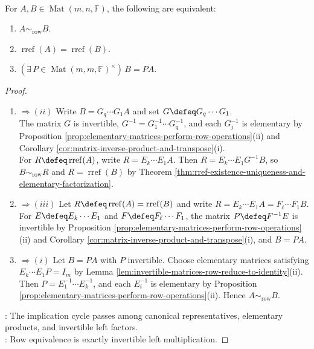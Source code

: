 \begin{corollary} \label{cor:row-equivalence-characterization} \\
For $A,B\in\operatorname{Mat}(m,n,\mathbb{F})$, the following are equivalent:
\begin{enumerate}[label=(\roman*)]
\setlength{\itemsep}{0pt}
\item $A\sim_{\mathrm{row}}B$.
\item $\operatorname{rref}(A)=\operatorname{rref}(B)$.
\item $(\exists\,P\in\operatorname{Mat}(m,m,\mathbb{F})^{\times})\,B=PA$.
\end{enumerate}
\begin{proof}
\begin{enumerate}[label=(\roman*)]
\setlength{\itemsep}{0pt}
\item[$(i)$]$\Rightarrow (ii)$ Write $B=G_q\cdots G_1A$ and set $G\defeq G_q\cdots G_1$.\\
The matrix $G$ is invertible, $G^{-1}=G_1^{-1}\cdots G_q^{-1}$, and each $G_j^{-1}$ is elementary by Proposition \ref{prop:elementary-matrices-perform-row-operations}(ii) and Corollary \ref{cor:matrix-inverse-product-and-transpose}(i).\\
For $R\defeq\operatorname{rref}(A)$, write $R=E_k\cdots E_1A$. Then $R=E_k\cdots E_1G^{-1}B$, so $B\sim_{\mathrm{row}}R$ and $R=\operatorname{rref}(B)$ by Theorem \ref{thm:rref-existence-uniqueness-and-elementary-factorization}. 
\item[$(ii)$]$\Rightarrow (iii)$ Let $R\defeq\operatorname{rref}(A)=\operatorname{rref}(B)$ and write $R=E_k\cdots E_1A=F_{\ell}\cdots F_1B$. For $E\defeq E_k\cdots E_1$ and $F\defeq F_{\ell}\cdots F_1$, the matrix $P\defeq F^{-1}E$ is invertible by Proposition \ref{prop:elementary-matrices-perform-row-operations}(ii) and Corollary \ref{cor:matrix-inverse-product-and-transpose}(i), and $B=PA$. 
\item[$(iii)$]$\Rightarrow (i)$ Let $B=PA$ with $P$ invertible. Choose elementary matrices satisfying $E_k\cdots E_1P=I_m$ by Lemma \ref{lem:invertible-matrices-row-reduce-to-identity}(ii).\\
Then $P=E_1^{-1}\cdots E_k^{-1}$, and each $E_i^{-1}$ is elementary by Proposition \ref{prop:elementary-matrices-perform-row-operations}(ii). Hence $A\sim_{\mathrm{row}}B$.
\end{enumerate}
: The implication cycle passes among canonical representatives, elementary products, and invertible left factors.\\
: Row equivalence is exactly invertible left multiplication.
\end{proof}
\end{corollary}

